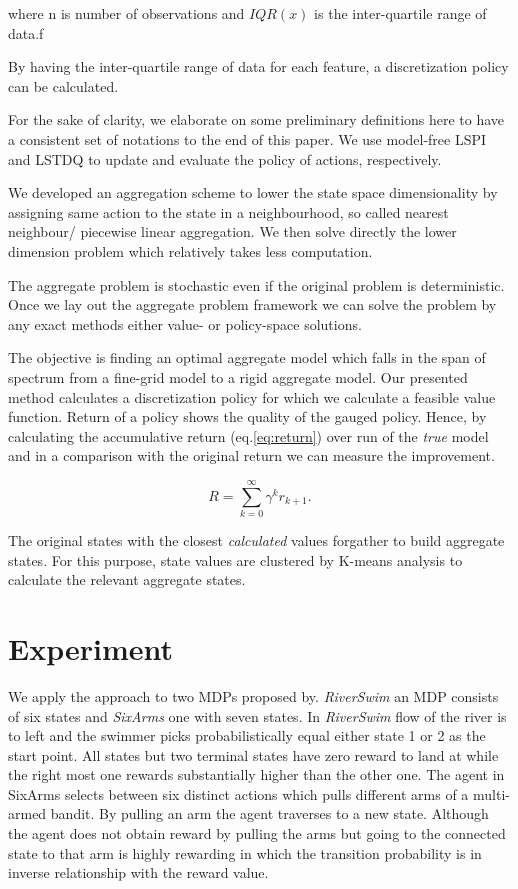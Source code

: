 \documentclass{article}
\begin{document}
    where n is number of observations and $IQR(x)$ is the inter-quartile range of data.f

    By having the inter-quartile range of data for each feature, a discretization policy can be calculated.


    For the sake of clarity, we elaborate on some preliminary definitions here to have a consistent set of notations
    to the end of this paper. We use model-free LSPI and LSTDQ \citep{Lagoudakis2003} to update and
    evaluate the policy of actions, respectively.

    We developed an aggregation scheme to lower the state space dimensionality by assigning same action to the state
    in a neighbourhood, so called nearest neighbour/ piecewise linear aggregation.
    We then solve directly the lower dimension problem which relatively takes less computation.

    The aggregate problem is stochastic even if the original problem is deterministic.
    Once we lay out the aggregate problem framework we can solve the problem by any exact methods either value- or
    policy-space solutions.


    The objective is finding an optimal aggregate model which falls in the span of spectrum from a fine-grid model
    to a rigid aggregate model.
    Our presented method calculates a discretization policy for which we calculate a feasible value function.
    Return of a policy shows the quality of the gauged policy.
    Hence, by calculating the accumulative return (eq.\ref{eq:return}) over run of the \textit{true} model and in a
    comparison with the original return we can measure the improvement.

    \begin{equation}
        R = \sum_{k=0}^{\infty} \gamma^{k} r_{k+1}. \label{eq:return}
    \end{equation}

    The original states with the closest \textit{calculated} values forgather to build aggregate states.
    For this purpose, state values are clustered by K-means analysis to calculate the relevant aggregate states.


    \section{Experiment}
    We apply the approach to two MDPs proposed by\cite{Strehl2004}.
    \textit{RiverSwim} an MDP consists of six states and \textit{SixArms} one with seven states.
    In \textit{RiverSwim} flow of the river is to left and the swimmer picks probabilistically equal either state 1
    or 2 as the start point.
    All states but two terminal states have zero reward to land at while the right most one rewards substantially
    higher than the other one.
    The agent in SixArms selects between six distinct actions which pulls different arms of a multi-armed bandit.
    By pulling an arm the agent traverses to a new state.
    Although the agent does not obtain reward by pulling the arms but going to the connected state to that arm is
    highly rewarding in which the transition probability is in inverse relationship with the reward value.
\end{document}
